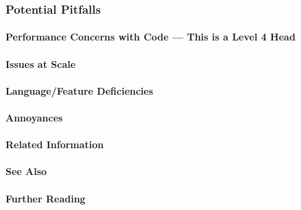 \subsubsection{Potential Pitfalls}

\paragraph[Performance Concerns with {\tt Code}]{Performance Concerns with {\ParaCode Code} --- This is a Level 4 Head}

\paragraph{Issues at Scale}

\paragraph{Language/Feature Deficiencies}

\paragraph{Annoyances}

\paragraph{Related Information}

\paragraph{See Also}

\paragraph{Further Reading}


